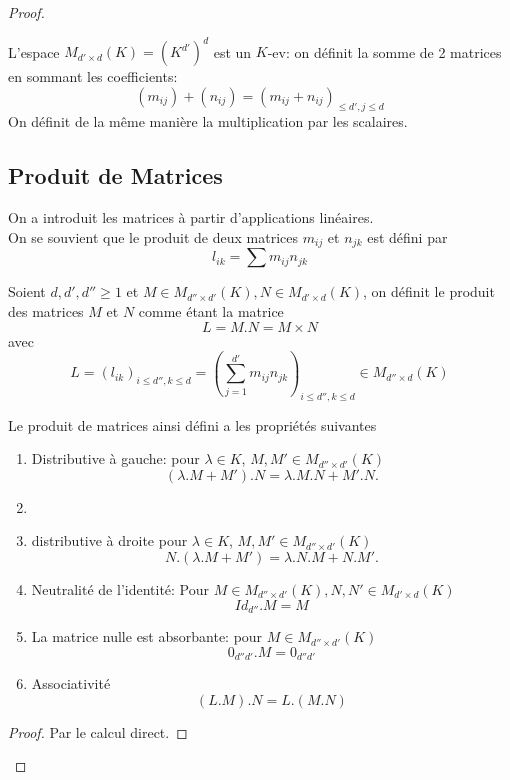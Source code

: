 \documentclass[../main.tex]{subfiles}
\begin{document}
\begin{proof}
\begin{defn}
\end{defn}
L'espace $M_{d' \times d} ( K) = ( K^{d'}) ^{d}$ est un $K$-ev: on définit la somme de 2 matrices en sommant les coefficients:
\[ 
	( m_{ij} ) + ( n_{ij} ) = ( m_{ij} + n_{ij} ) _{\leq d', j \leq d} 
\]
On définit de la même manière la multiplication par les scalaires.
\subsection{Produit de Matrices}
On a introduit les matrices à partir d'applications linéaires.\\
On se souvient que le produit de deux matrices $m_{ij} $ et $n_{j k} $ est défini par
\[ 
l_{ik} = \sum m_{ij} n_{j k} 
\]
\begin{defn}\label{defn:multiplication_matricielle}
	Soient $d, d', d'' \geq 1$ et $M \in M_{d'' \times d'} ( K) , N \in M_{d'\times d} ( K) $, on définit le produit des matrices $M$ et $N$ comme étant la matrice
	\[ 
	L= M.N = M\times N
	\]
	avec 
	\[ 
		L= ( l_{ik} ) _{i\leq d'', k \leq d} = ( \sum_{j=1}^{ d'} m_{ij} n_{j k} ) _{i\leq d'', k \leq d} \in M_{d'' \times d} ( K) 
	\]
	
\end{defn}

\begin{thm}
	Le produit de matrices ainsi défini a les propriétés suivantes
	\begin{enumerate}
		\item Distributive à gauche: pour $\lambda \in K$, $M,M' \in M_{d'' \times d'} ( K) $ 
			\[ 
				( \lambda.M+ M'). N = \lambda.M.N + M'.N.
			\]
			\item 
			\item distributive à droite pour $\lambda \in K$, $M,M' \in M_{d'' \times d'} ( K) $ 
			\[ 
				 N.( \lambda.M+ M') = \lambda.N.M + N.M'.
			 \]

		 \item Neutralité de l'identité: Pour $M \in M_{d''\times d'} ( K) , N,N' \in M_{d' \times d} ( K) $
			 \[ 
			 Id_{d''} .M = M
		 \]
			 

		 \item La matrice nulle est absorbante: pour $M \in M_{d'' \times d'} ( K) $ 
			 \[ 
				 0_{d''d'} .M = 0_{d''d'}
			 \]

		\item Associativité
			\[ 
				( L.M) .N = L.(M.N) 
			\]
			
			 
			
	\end{enumerate}
	
\end{thm}

\begin{proof}
Par le calcul direct.
\end{proof}





\end{proof}
\end{document}

